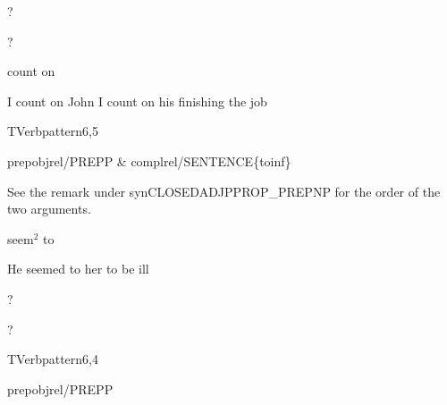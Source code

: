 
\begin{thetadescr}
\evitem ?
\esitem
     \begin{examples}
        \example ?
     \end{examples}
\end{thetadescr}



\begin{thetadescr}
\evitem count on
\esitem
     \begin{examples}
        \example I count on John
        \example I count on his finishing the job
     \end{examples}
\end{thetadescr}


\newpage
{}
\begin{vpattern}
 TVerbpattern6,5
\csritem \mbox{}\\
     \begin{csr}
      prepobjrel/PREPP & complrel/SENTENCE\{toinf\}
     \end{csr}
\remarksitem See the remark under synCLOSEDADJPPROP\_PREPNP for the order of 
the two arguments.
\end{vpattern}


\begin{thetadescr}
\evitem seem$^{2}$ to
\esitem
     \begin{examples}
        \example  He seemed to her to be ill
     \end{examples}
\end{thetadescr}



\begin{thetadescr}
\evitem ?
\esitem
     \begin{examples}
        \example ?
     \end{examples}
\end{thetadescr}


\newpage
{}
\begin{vpattern}
 TVerbpattern6,4
\csritem \mbox{}\\
     \begin{csr}
      prepobjrel/PREPP 
     \end{csr}
\remarksitem 
\end{vpattern}

